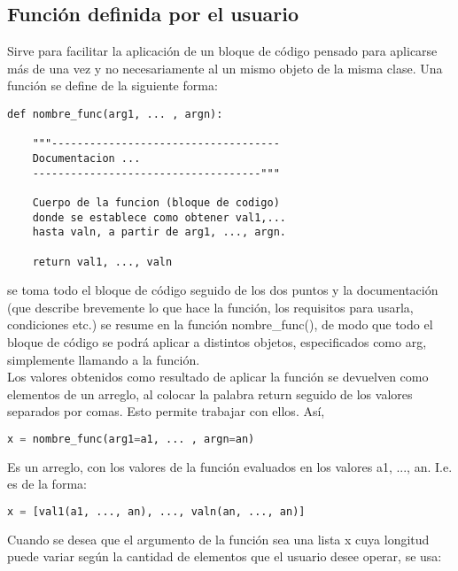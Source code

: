 \documentclass[10pt,oneside]{article}
\begin{document}
\begin{multicols}{2}
            \section{Función definida por el usuario}

                Sirve para facilitar la aplicación de un bloque de código pensado para aplicarse más de una vez y no necesariamente al un mismo objeto de la misma clase. Una función se define de la siguiente forma:

                \begin{lstlisting}
def nombre_func(arg1, ... , argn):

    """------------------------------------
    Documentacion ... 
    ------------------------------------"""
    
    Cuerpo de la funcion (bloque de codigo)
    donde se establece como obtener val1,...
    hasta valn, a partir de arg1, ..., argn.

    return val1, ..., valn
                \end{lstlisting}

                se toma todo el bloque de código seguido de los dos puntos y la documentación (que describe brevemente lo que hace la función, los requisitos para usarla, condiciones etc.) se resume en la función  nombre\_func(), de modo que todo el bloque de código se podrá aplicar a distintos objetos, especificados como arg, simplemente llamando a la función.\\\newline Los valores obtenidos como resultado de aplicar la función se devuelven como elementos de un arreglo, al colocar la palabra return seguido de los valores separados por comas. Esto permite trabajar con ellos. Así,  

                \begin{lstlisting}[language=Python]
x = nombre_func(arg1=a1, ... , argn=an)
                \end{lstlisting}

                Es un arreglo, con los valores de la función evaluados en los valores a1, ..., an. I.e. es de la forma: 

                \begin{lstlisting}[language=Python]
x = [val1(a1, ..., an), ..., valn(an, ..., an)]
                \end{lstlisting}

                Cuando se desea que el argumento de la función sea una lista x cuya longitud puede variar según la cantidad de elementos que el usuario desee operar, se usa:


\end{multicols}
\end{document}
